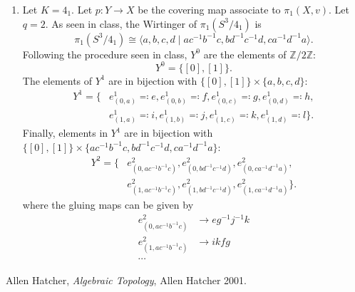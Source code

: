 \documentclass[11pt,a4paper]{article}
\newcommand{\im}{\operatorname{Im}}
\newcommand{\Z}{\mathbb Z}
\begin{document}
\begin{enumerate}[label=\alph*)]
\begin{proof}
    To prove the existence of $H$, note that as $ K $ is tame, Wirtinger presentation of $\pi_1(X)$ has a finite number of generators $ g_1, \dots, g_n$. Fix any $[k] \in \Z / q\Z $ different from $ 0 $ and note that it must be a generator of $ \Z / q\Z $ since $ q $ is prime. Map every generator of $\pi_1(X)$ to $ [k] $ trough the homomorphism $ \phi \colon \pi_1(X) \twoheadrightarrow \Z / q\Z $. That is, $ \phi(g_i) = [k] $ for all $ i = 1 \dots n $. This is well-defined because the Wirtinger presentation relations imply that all generators are conjugate to one another, and they are sent to the same element under the given assignment. Note that $ \phi $ is surjective because $ h $ is a generator. By the first group isometry theorem we have
    $$
      \pi_1(X)/\ker(\phi) \cong \im(\phi) \cong \Z / q\Z.
    $$
    Now, just take $ H = \ker(\phi) $.
  \end{proof}
  \item Let $ K = 4_1 $. Let $ p: Y \to X $ be the covering map associate to $\pi_1(X, v) $. Let $ q = 2 $. As seen in class, the Wirtinger of $ \pi_1(S^3/4_1) $ is
  $$
    \pi_1(S^3/4_1) \cong \langle a, b, c, d \mid a c^{-1} b^{-1} c, b d^{-1} c^{-1} d, c a^{-1} d^{-1} a \rangle.
  $$
  Following the procedure seen in class, $ Y^0 $ are the elements of $ \Z / 2\Z $:
  $$
    Y^0 = \{ [0], [1] \}.
  $$
  The elements of $Y^1$ are in bijection with $ \{ [0], [1] \} \times \{a, b, c, d\} $:
  \begin{align*}
    Y^1 = \bigl\{&e^1_{(0, a)} \eqcolon e, e^1_{(0, b)} \eqcolon f, e^1_{(0, c)} \eqcolon g, e^1_{(0, d)} \eqcolon h, \\
    &e^1_{(1, a)} \eqcolon i, e^1_{(1, b)} \eqcolon j, e^1_{(1, c)} \eqcolon k, e^1_{(1, d)} \eqcolon l\bigr\}.
  \end{align*}
  Finally, elements in $Y^1$ are in bijection with $ \{ [0], [1] \} \times \{a c^{-1} b^{-1} c, b d^{-1} c^{-1} d, c a^{-1} d^{-1} a\} $:
  \begin{align*}
    Y^2 = \bigl\{&e^2_{(0, a c^{-1} b^{-1} c)}, e^2_{(0, b d^{-1} c^{-1} d)}, e^2_{(0, c a^{-1} d^{-1} a)}, \\
    &e^2_{(1, a c^{-1} b^{-1} c)}, e^2_{(1, b d^{-1} c^{-1} d)}, e^2_{(1, c a^{-1} d^{-1} a)}\bigr\}.
  \end{align*}
  where the gluing maps can be given by
  \begin{align*}
    e^2_{(0, a c^{-1} b^{-1} c)} &\longrightarrow e g^{-1} j^{-1} k \\
    e^2_{(1, a c^{-1} b^{-1} c)} &\longrightarrow i k f g \\
    \cdots
  \end{align*}
  \end{enumerate}
  

\begin{thebibliography}{9}

  Allen Hatcher,
  \textit{Algebraic Topology},
  Allen Hatcher 2001.

\end{thebibliography}
\end{document}
